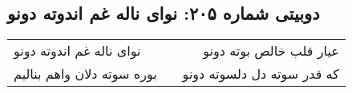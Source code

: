 \begin{center}
\section*{دوبیتی شماره ۲۰۵: نوای ناله غم اندوته دونو}
\label{sec:205}
\begin{longtable}{l p{0.5cm} r}
نوای ناله غم اندوته دونو
&&
عیار قلب خالص بوته دونو
\\
بوره سوته دلان واهم بنالیم
&&
که قدر سوته دل دلسوته دونو
\\
\end{longtable}
\end{center}
